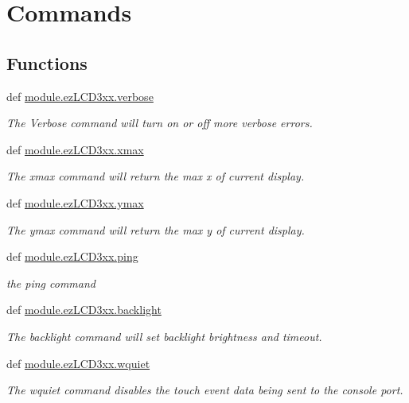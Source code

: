 \hypertarget{group___general}{\section{Commands}
\label{group___general}
}
\subsection*{Functions}
\begin{DoxyCompactItemize}
\item 
def \hyperlink{group___general_ga350c2e1be0d3d074d79d7a7278c44a22}{module.\-ez\-L\-C\-D3xx.\-verbose}
\begin{DoxyCompactList}\small\item\em The Verbose command will turn on or off more verbose errors. \end{DoxyCompactList}\item 
def \hyperlink{group___general_ga594f839f4d44b15ece850c795ec8e7ba}{module.\-ez\-L\-C\-D3xx.\-xmax}
\begin{DoxyCompactList}\small\item\em The xmax command will return the max x of current display. \end{DoxyCompactList}\item 
def \hyperlink{group___general_gae8e395513eeb5519612f3e988a059106}{module.\-ez\-L\-C\-D3xx.\-ymax}
\begin{DoxyCompactList}\small\item\em The ymax command will return the max y of current display. \end{DoxyCompactList}\item 
def \hyperlink{group___general_ga123be6aba6fc316922b71e3fe1bc7aaf}{module.\-ez\-L\-C\-D3xx.\-ping}
\begin{DoxyCompactList}\small\item\em the ping command \end{DoxyCompactList}\item 
def \hyperlink{group___general_ga8b73d9d966ac29c172e81aac05bf9bf9}{module.\-ez\-L\-C\-D3xx.\-backlight}
\begin{DoxyCompactList}\small\item\em The backlight command will set backlight brightness and timeout. \end{DoxyCompactList}\item 
def \hyperlink{group___general_gae760b8839f85e30c2a294a593e77b9d7}{module.\-ez\-L\-C\-D3xx.\-wquiet}
\begin{DoxyCompactList}\small\item\em The wquiet command disables the touch event data being sent to the console port. \end{DoxyCompactList}\item 

\end{DoxyCompactItemize}
